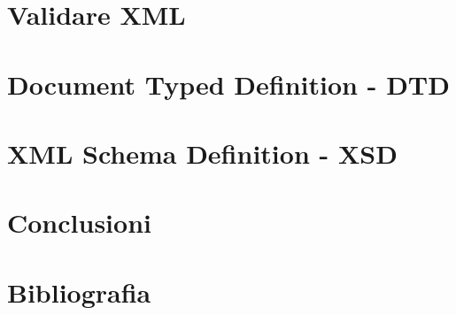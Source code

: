 \documentclass{beamer}
\begin{document}
    \section{Validare XML }
    
    \section{Document Typed Definition - DTD}
    
    
    \section{XML Schema Definition - XSD}
    
    \section{Conclusioni}
    
    \section*{Bibliografia}
    
    
\end{document}
